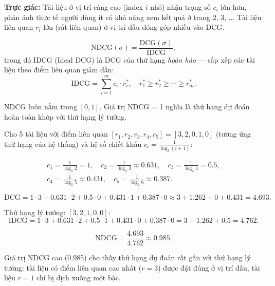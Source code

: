 \textbf{Trực giác:} Tài liệu ở vị trí càng cao (index $i$ nhỏ) nhận trọng số $c_i$ lớn hơn, phản ánh thực tế người dùng ít có khả năng xem kết quả ở trang 2, 3, $\ldots$ Tài liệu liên quan $r_i$ lớn (rất liên quan) ở vị trí đầu đóng góp nhiều vào DCG.

\begin{definition}
\begin{equation}
    \mathrm{NDCG}(\sigma) = \frac{\mathrm{DCG}(\sigma)}{\mathrm{IDCG}},
    \label{eq:ndcg}
\end{equation}
trong đó $\mathrm{IDCG}$ (Ideal DCG) là DCG của thứ hạng \emph{hoàn hảo} --- sắp xếp các tài liệu theo điểm liên quan giảm dần:
\begin{equation}
    \mathrm{IDCG} = \sum_{i=1}^{m} c_i \cdot r^*_i, \quad r^*_1 \geq r^*_2 \geq \cdots \geq r^*_m.
    \label{eq:idcg}
\end{equation}
\end{definition}

NDCG luôn nằm trong $[0, 1]$. Giá trị NDCG = 1 nghĩa là thứ hạng dự đoán hoàn toàn khớp với thứ hạng lý tưởng.

\begin{example}
Cho 5 tài liệu với điểm liên quan $[r_1, r_2, r_3, r_4, r_5] = [3, 2, 0, 1, 0]$ (tương ứng thứ hạng của hệ thống) và hệ số chiết khấu $c_i = \frac{1}{\log_2(i+1)}$:

\begin{align*}
    c_1 = \frac{1}{\log_2 2} = 1, \quad c_2 = \frac{1}{\log_2 3} \approx 0.631, \quad c_3 = \frac{1}{\log_2 4} = 0.5, \\
    c_4 = \frac{1}{\log_2 5} \approx 0.431, \quad c_5 = \frac{1}{\log_2 6} \approx 0.387.
\end{align*}

\[
    \mathrm{DCG} = 1 \cdot 3 + 0.631 \cdot 2 + 0.5 \cdot 0 + 0.431 \cdot 1 + 0.387 \cdot 0 \approx 3 + 1.262 + 0 + 0.431 = 4.693.
\]

Thứ hạng lý tưởng: $[3, 2, 1, 0, 0]$:
\[
    \mathrm{IDCG} = 1 \cdot 3 + 0.631 \cdot 2 + 0.5 \cdot 1 + 0.431 \cdot 0 + 0.387 \cdot 0 = 3 + 1.262 + 0.5 = 4.762.
\]

\[
    \mathrm{NDCG} = \frac{4.693}{4.762} \approx 0.985.
\]

Giá trị NDCG cao (0.985) cho thấy thứ hạng dự đoán rất gần với thứ hạng lý tưởng: tài liệu có điểm liên quan cao nhất ($r=3$) được đặt đúng ở vị trí đầu, tài liệu $r=1$ chỉ bị dịch xuống một bậc.
\end{example}

